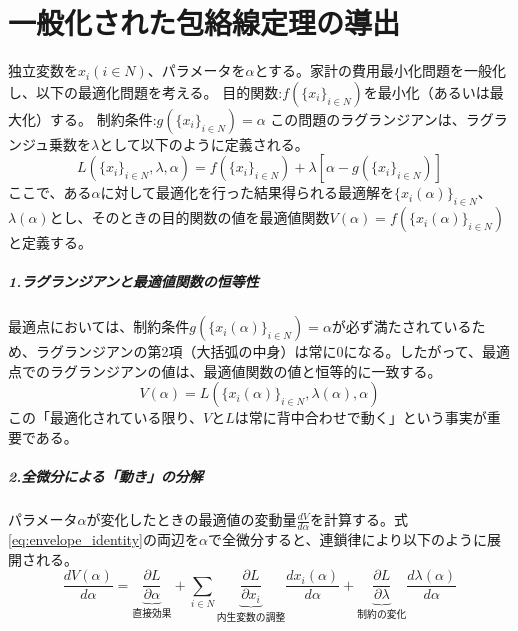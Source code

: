 
\chapter{一般化された包絡線定理の導出}
\label{chap:appendix_envelope}

独立変数を\(x_i(i\in N)\)、パラメータを\(\alpha\)とする。家計の費用最小化問題を一般化し、以下の最適化問題を考える。
目的関数:\(f(\{x_i\}_{i\in N})\)を最小化（あるいは最大化）する。
制約条件:\(g(\{x_i\}_{i\in N})=\alpha\)
この問題のラグランジアンは、ラグランジュ乗数を\(\lambda\)として以下のように定義される。
\begin{equation}
\label{eq:envelope_lagrangian_def}
    L(\{x_i\}_{i\in N}, \lambda, \alpha)=f(\{x_i\}_{i\in N})+\lambda[\alpha-g(\{x_i\}_{i\in N})]
\end{equation}
ここで、ある\(\alpha\)に対して最適化を行った結果得られる最適解を\(\{x_i(\alpha)\}_{i\in N}\)、\(\lambda(\alpha)\)とし、そのときの目的関数の値を最適値関数\(V(\alpha)=f(\{x_i(\alpha)\}_{i\in N})\)と定義する。

\paragraph{1.ラグランジアンと最適値関数の恒等性}
最適点においては、制約条件\(g(\{x_i(\alpha)\}_{i\in N})=\alpha\)が必ず満たされているため、ラグランジアンの第2項（大括弧の中身）は常に0になる。したがって、最適点でのラグランジアンの値は、最適値関数の値と恒等的に一致する。
\begin{equation}
\label{eq:envelope_identity}
    V(\alpha)=L(\{x_i(\alpha)\}_{i\in N}, \lambda(\alpha), \alpha)
\end{equation}
この「最適化されている限り、\(V\)と\(L\)は常に背中合わせで動く」という事実が重要である。

\paragraph{2.全微分による「動き」の分解}
パラメータ\(\alpha\)が変化したときの最適値の変動量\(\frac{dV}{d\alpha}\)を計算する。式\eqref{eq:envelope_identity}の両辺を\(\alpha\)で全微分すると、連鎖律により以下のように展開される。
\begin{equation}
\label{eq:envelope_total_derivative}
    \frac{dV(\alpha)}{d\alpha}=\underbrace{\frac{\partial L}{\partial \alpha}}_{\text{直接効果}}+\sum_{i\in N}\underbrace{\frac{\partial L}{\partial x_i}}_{\text{内生変数の調整}}\frac{dx_i(\alpha)}{d\alpha}+\underbrace{\frac{\partial L}{\partial \lambda}}_{\text{制約の変化}}\frac{d\lambda(\alpha)}{d\alpha}
\end{equation}


